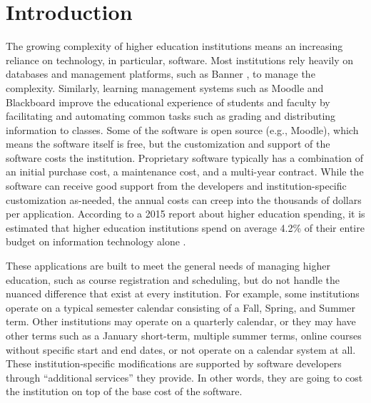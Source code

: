 \section{Introduction}

The growing complexity of higher education institutions means an increasing reliance on technology, in particular, software. Most institutions rely heavily on databases and management platforms, such as Banner \cite{BannerWebsite}, to manage the complexity. Similarly, learning management systems such as Moodle \cite{MoodleWebsite} and Blackboard \cite{BlackboardWebsite} improve the educational experience of students and faculty by facilitating and automating common tasks such as grading and distributing information to classes. Some of the software is open source (e.g., Moodle), which means the software itself is free, but the customization and support of the software costs the institution. Proprietary software typically has a combination of an initial purchase cost, a maintenance cost, and a multi-year contract. While the software can receive good support from the developers and institution-specific customization as-needed, the annual costs can creep into the thousands of dollars per application. According to a 2015 report about higher education spending, it is estimated that higher education institutions spend on average 4.2\% of their entire budget on information technology alone \cite{CDSBenchmarkReport}. 



These applications are built to meet the general needs of managing higher education, such as course registration and scheduling, but do not handle the nuanced difference that exist at every institution. For example, some institutions operate on a typical semester calendar consisting of a Fall, Spring, and Summer term. Other institutions may operate on a quarterly calendar, or they may have other terms such as a January short-term, multiple summer terms, online courses without specific start and end dates, or not operate on a calendar system at all. These institution-specific modifications are supported by software developers through ``additional services'' they provide. In other words, they are going to cost the institution on top of the base cost of the software.

